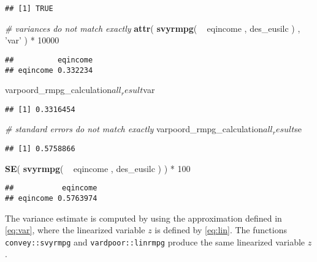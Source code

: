\documentclass[]{book}
\newenvironment{Shaded}{\begin{snugshade}}{\end{snugshade}}
\newcommand{\KeywordTok}[1]{\textcolor[rgb]{0.13,0.29,0.53}{\textbf{{#1}}}}
\newcommand{\DecValTok}[1]{\textcolor[rgb]{0.00,0.00,0.81}{{#1}}}
\newcommand{\StringTok}[1]{\textcolor[rgb]{0.31,0.60,0.02}{{#1}}}
\newcommand{\CommentTok}[1]{\textcolor[rgb]{0.56,0.35,0.01}{\textit{{#1}}}}
\newcommand{\NormalTok}[1]{{#1}}
\theoremstyle{definition}
\theoremstyle{definition}
\theoremstyle{remark}
\begin{document}
\begin{verbatim}
## [1] TRUE
\end{verbatim}

\begin{Shaded}
\begin{Highlighting}[]
\CommentTok{# variances do not match exactly}
\KeywordTok{attr}\NormalTok{( }\KeywordTok{svyrmpg}\NormalTok{( ~}\StringTok{ }\NormalTok{eqincome , des_eusilc ) , }\StringTok{'var'} \NormalTok{) *}\StringTok{ }\DecValTok{10000}
\end{Highlighting}
\end{Shaded}

\begin{verbatim}
##          eqincome
## eqincome 0.332234
\end{verbatim}

\begin{Shaded}
\begin{Highlighting}[]
\NormalTok{varpoord_rmpg_calculation$all_result$var}
\end{Highlighting}
\end{Shaded}

\begin{verbatim}
## [1] 0.3316454
\end{verbatim}

\begin{Shaded}
\begin{Highlighting}[]
\CommentTok{# standard errors do not match exactly}
\NormalTok{varpoord_rmpg_calculation$all_result$se}
\end{Highlighting}
\end{Shaded}

\begin{verbatim}
## [1] 0.5758866
\end{verbatim}

\begin{Shaded}
\begin{Highlighting}[]
\KeywordTok{SE}\NormalTok{( }\KeywordTok{svyrmpg}\NormalTok{( ~}\StringTok{ }\NormalTok{eqincome , des_eusilc ) ) *}\StringTok{ }\DecValTok{100}
\end{Highlighting}
\end{Shaded}

\begin{verbatim}
##           eqincome
## eqincome 0.5763974
\end{verbatim}

The variance estimate is computed by using the approximation defined in
\eqref{eq:var}, where the linearized variable \(z\) is defined by
\eqref{eq:lin}. The functions \texttt{convey::svyrmpg} and
\texttt{vardpoor::linrmpg} produce the same linearized variable \(z\).
\end{document}
